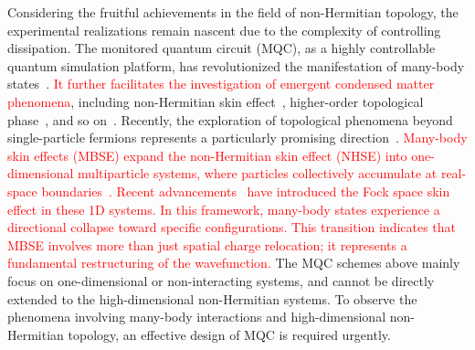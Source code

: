 \documentclass[longbibliography, aps, prx, amsmath, amssymb, amsfonts, twocolumn,superscriptaddress, footinbib]{revtex4-1}
\begin{document}
	Considering the fruitful achievements in the field of non-Hermitian topology, the experimental realizations remain nascent due to the complexity of controlling dissipation.
    The monitored quantum circuit (MQC), as a highly controllable quantum simulation platform, has revolutionized the manifestation of many-body states~\cite{skinner2019measurement,nahum2017quantum,gullans2020dynamical,koh2023measurement,li2023cross,choi2020quantum,minato2022fate,yang2025bridging,potter2022entanglement,iqbal2024non,zhang2025physics}. 
	\textcolor{red}{It further facilitates the investigation of emergent condensed matter phenomena}, including non-Hermitian skin effect~\cite{fleckenstein2022non}, higher-order topological phase~\cite{koh2024realization}, and so on~\cite{iqbal2024non}. 
	Recently, the exploration of topological phenomena beyond single-particle fermions represents a particularly promising direction~\cite{deng2022observing, zhao2025}.
	\textcolor{red}{
		Many-body skin effects (MBSE) expand the non-Hermitian skin effect (NHSE) into one-dimensional multiparticle systems, where particles collectively accumulate at real-space boundaries~\cite{shen2025observation}. Recent advancements~\cite{shen2024enhanced,shimomura2024general} have introduced the Fock space skin effect in these 1D systems. In this framework, many-body states experience a directional collapse toward specific configurations. This transition indicates that MBSE involves more than just spatial charge relocation; it represents a fundamental restructuring of the wavefunction.
	}
	The MQC schemes above mainly focus on one-dimensional or non-interacting systems, and cannot be directly extended to the high-dimensional non-Hermitian systems. To observe the phenomena involving many-body interactions and high-dimensional non-Hermitian topology, an effective design of MQC is required urgently.
\end{document}
